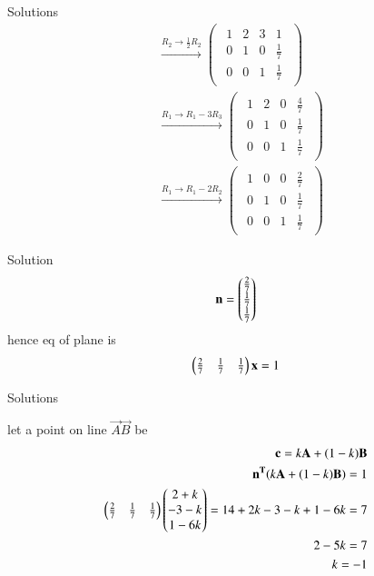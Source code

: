 \documentclass{beamer}
\begin{document}
\begin{frame}{Solutions}
    \begin{align}
  &\xrightarrow{R_2 \to \tfrac{1}{2}R_2}
\begin{pmatrix}
\begin{array}{ccc|c}
1 & 2 & 3 & 1\\
0 & 1 & 0 & \tfrac{1}{7}\\
0 & 0 & 1 & \tfrac{1}{7}
\end{array}
\end{pmatrix} \\[4pt]
&\xrightarrow{R_1 \to R_1 - 3R_3}
\begin{pmatrix}
\begin{array}{ccc|c}
1 & 2 & 0 & \tfrac{4}{7}\\
0 & 1 & 0 & \tfrac{1}{7}\\
0 & 0 & 1 & \tfrac{1}{7}
\end{array}
\end{pmatrix} \\[4pt]
&\xrightarrow{R_1 \to R_1 - 2R_2}
\begin{pmatrix}
\begin{array}{ccc|c}
1 & 0 & 0 & \tfrac{2}{7}\\
0 & 1 & 0 & \tfrac{1}{7}\\
0 & 0 & 1 & \tfrac{1}{7}
\end{array}
\end{pmatrix}  
\end{align}
\end{frame}
\begin{frame}{Solution}
    \begin{align}
\mathbf{n}=
\begin{pmatrix}\frac{2}{7}
       \\
       \frac{1}{7}
       \\
       \frac{1}{7}
\end{pmatrix}
\end{align}  
hence eq of plane is
\begin{align}
 \begin{pmatrix}\tfrac{2}{7} & \tfrac{1}{7} & \tfrac{1}{7}\end{pmatrix} 
 \mathbf{x}
 =1
\end{align}   
\end{frame}
\begin{frame}{Solutions}

    let a point on line $\vec{A}\vec{B}$ be 
\begin{align}
\mathbf{c}=k\mathbf{A}+(1-k)\mathbf{B}\\
\mathbf{n^T}(k\mathbf{A}+(1-k)\mathbf{B})
=1\\
\begin{pmatrix}\frac{2}{7} & \frac{1}{7} & \frac{1}{7}\end{pmatrix}
\begin{pmatrix}2+k
               \\
              -3-k
              \\
              1-6k
              \end{pmatrix}
 =1
 4+2k-3-k+1-6k=7\\
2-5k=7\\
k=-1
\end{align}
\end{frame}
\end{document}
